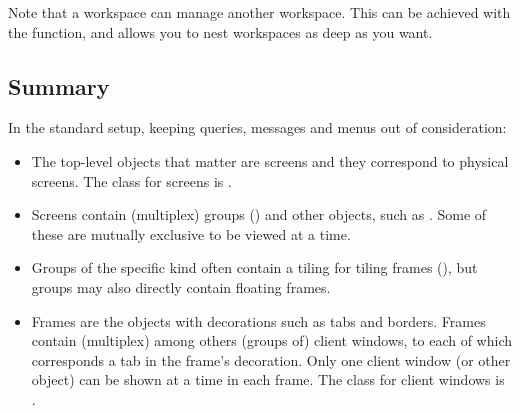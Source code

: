 Note that a workspace can manage another workspace. This can be
achieved with the  function, and allows you to nest
workspaces as deep as you want.


\subsection{Summary}

In the standard setup, keeping queries, messages and menus out of
consideration:

\begin{itemize}
  \item The top-level objects that matter are screens and they correspond
    to physical screens. The class for screens is .
  \item Screens contain (multiplex) groups () and other 
    objects, such as . Some of these are mutually exclusive
    to be viewed at a time.
  \item Groups of the specific kind  often contain a
     tiling for tiling frames (), but 
    groups may also directly contain floating frames.
  \item Frames are the objects with decorations such as tabs and borders.
    Frames contain (multiplex) among others (groups of) client windows, 
    to each of which corresponds a tab in the frame's decoration. Only 
    one client window (or other object) can be shown at a time in each 
    frame. The class for client windows is .
\end{itemize}

